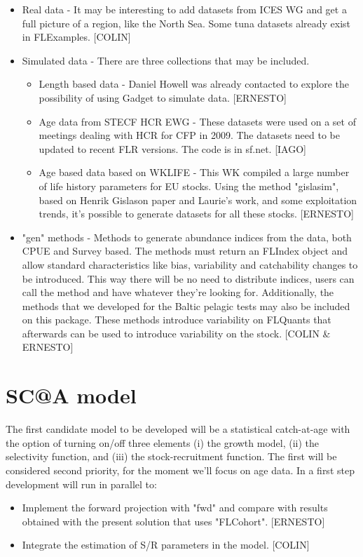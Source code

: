 \documentclass[10pt,a4paper]{article}
\begin{document}
\begin{itemize}
	\item Real data - It may be interesting to add datasets from ICES WG and get a full picture of a region, like the North Sea. Some tuna datasets already exist in FLExamples. [COLIN]  
	\item Simulated data - There are three collections that may be included.
	\begin{itemize}
		\item Length based data - Daniel Howell was already contacted to explore the possibility of using Gadget to simulate data. [ERNESTO]
		\item Age data from STECF HCR EWG - These datasets were used on a set of meetings dealing with HCR for CFP in 2009. The datasets need to be updated to recent FLR versions. The code is in sf.net. [IAGO]
		\item Age based data based on WKLIFE - This WK compiled a large number of life history parameters for EU stocks. Using the method "gislasim", based on Henrik Gislason paper and Laurie's work, and some exploitation trends, it's possible to generate datasets for all these stocks. [ERNESTO]   
	\end{itemize}
	\item "gen" methods - Methods to generate abundance indices from the data, both CPUE and Survey based. The methods must return an FLIndex object and allow standard characteristics like bias, variability and catchability changes to be introduced. This way there will be no need to distribute indices, users can call the method and have whatever they're looking for. Additionally, the methods that we developed for the Baltic pelagic tests may also be included on this package. These methods introduce variability on FLQuants that afterwards can be used to introduce variability on the stock. [COLIN \& ERNESTO]
\end{itemize}

\section{SC@A model}
The first candidate model to be developed will be a statistical catch-at-age with the option of turning on/off three elements (i) the growth model, (ii) the selectivity function, and (iii) the stock-recruitment function. The first will be considered second priority, for the moment we'll focus on age data.
In a first step development will run in parallel to:
\begin{itemize}
	\item Implement the forward projection with "fwd" and compare with results obtained with the present solution that uses "FLCohort". [ERNESTO]
	\item Integrate the estimation of S/R parameters in the model. [COLIN]
\end{itemize}
\end{document}
